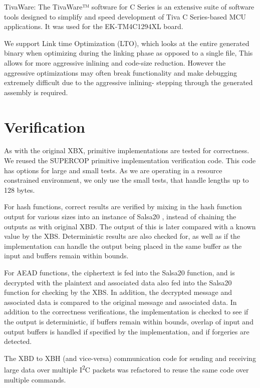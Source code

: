 \documentclass[twoside,11pt]{cergdoc}
\newcommand{\ITwoC}{I\textsuperscript{2}C }
\begin{document}
TivaWare: The TivaWare™ software for
C Series is an extensive suite of software
tools designed to simplify and speed
development of Tiva C Series-based
MCU applications. It was used for the
EK-TM4C1294XL board.

We support Link time Optimization (LTO), which looks at the entire
generated binary when optimizing during the linking phase as opposed to a single
file, This allows for more aggressive inlining and code-size reduction. However
the aggressive optimizations may often break functionality and make debugging
extremely difficult due to the aggressive inlining- stepping through the
generated assembly is required. 

  \section{Verification}
As with the original XBX, primitive implementations are tested for correctness.
We reused the SUPERCOP primitive implementation verification code. This code has
options for large and small tests. As we are operating in a resource constrained
environment, we only use the small tests, that handle lengths up to 128 bytes. 

For hash functions, correct results are verified by mixing in the
hash function output for various sizes into an instance of Salsa20
\cite{salsa20}, instead of chaining the outputs as with original XBD. The output
of this is later compared with a known value by the XBS.
Deterministic results are also checked for, as well as if 
the implementation can handle the output being placed in the same buffer as the
input and buffers remain within bounds. 

For AEAD functions, the ciphertext is fed into the Salsa20 function, and is
decrypted with the plaintext and associated data also fed into the
Salsa20 function for checking by the XBS. In addition, the decrypted message and
associated data is compared to the original message and associated data. 
In addition to the correctness verifications, the implementation is checked to
see if the output is deterministic, if buffers remain within bounds, overlap of
input and output buffers is handled if specified by the implementation, and if
forgeries are detected.

The XBD to XBH (and vice-versa) communication code for sending and receiving
large data over multiple \ITwoC packets was refactored to reuse the same code
over multiple commands. 

\end{document}
